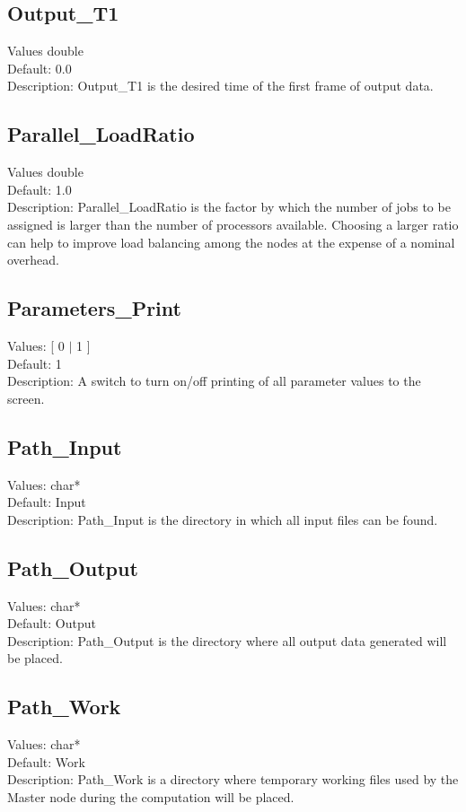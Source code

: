 \documentclass[11pt]{article}
\begin{document}
\subsection{Output\_T1}
Values   double \\
Default:  0.0\\
Description:  Output\_T1 is the desired time of the first frame of output data.

\subsection{Parallel\_LoadRatio}
Values   double \\
Default:  1.0\\
Description:  Parallel\_LoadRatio is the factor by which the number of jobs to be assigned is larger than the number of processors available.  Choosing a larger ratio can help to improve load balancing among the nodes at the expense of a nominal overhead. 

\subsection{Parameters\_Print}
Values: [ 0 $|$ 1 ]\\
Default:  1\\
Description:   A switch to turn on/off printing of all parameter values to the screen.

\subsection{Path\_Input}
Values:   char*\\
Default:  Input\\
Description:  Path\_Input is the directory in which all input files can be found.

\subsection{Path\_Output}
Values:   char*\\
Default:  Output\\
Description:   Path\_Output is the directory where all output data generated will be placed.

\subsection{Path\_Work}
Values:   char*\\
Default:  Work\\
Description:  Path\_Work is a directory where temporary working files used by the Master node during the computation will be placed.
\end{document}
